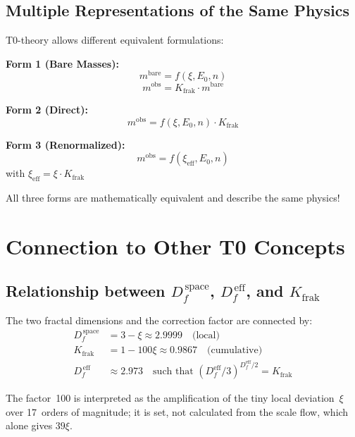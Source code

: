 	\subsection{Multiple Representations of the Same Physics}
	
	T0-theory allows different equivalent formulations:
	
	\textbf{Form 1 (Bare Masses):}
	\begin{equation}
		m^{\text{bare}} = f(\xi, E_0, n)
	\end{equation}
	\begin{equation}
		m^{\text{obs}} = K_{\text{frak}} \cdot m^{\text{bare}}
	\end{equation}
	
	\textbf{Form 2 (Direct):}
	\begin{equation}
		m^{\text{obs}} = f(\xi, E_0, n) \cdot K_{\text{frak}}
	\end{equation}
	
	\textbf{Form 3 (Renormalized):}
	\begin{equation}
		m^{\text{obs}} = f(\xi_{\text{eff}}, E_0, n)
	\end{equation}
	with $\xi_{\text{eff}} = \xi \cdot K_{\text{frak}}$
	
	All three forms are mathematically equivalent and describe the same physics!
	
	\section{Connection to Other T0 Concepts}
	
	\subsection{Relationship between $D_f^{\,\text{space}}$, $D_f^{\,\text{eff}}$, and $K_{\text{frak}}$}
	
	The two fractal dimensions and the correction factor are connected by:
	\begin{align}
		D_f^{\,\text{space}} &= 3 - \xi \approx 2.9999 \quad \text{(local)} \\
		K_{\text{frak}} &= 1 - 100\xi \approx 0.9867 \quad \text{(cumulative)} \\
		D_f^{\,\text{eff}} &\approx 2.973 \quad \text{such that } (D_f^{\text{eff}}/3)^{D_f^{\text{eff}}/2} = K_{\text{frak}}
	\end{align}
	
	The factor~100 is interpreted as the amplification of the tiny local deviation~$\xi$ over 17~orders of magnitude; it is set, not calculated from the scale flow, which alone gives $39\xi$.

